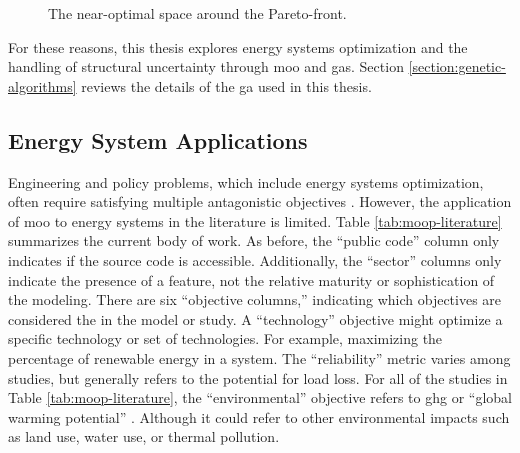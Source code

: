 \begin{figure}[H]
  \centering
  \resizebox{0.6\columnwidth}{!}{}
  \caption{The near-optimal space around the Pareto-front.}
  \label{fig:near-opt-pareto}
\end{figure}

For these reasons, this thesis explores energy systems optimization and the
handling of structural uncertainty through \ac{moo} and \acp{ga}. Section
\ref{section:genetic-algorithms} reviews the details of the \ac{ga} used in this
thesis.


% 



\subsection{Energy System Applications}
Engineering and policy problems, which include energy
systems optimization, often require satisfying multiple antagonistic objectives
\cite{loughlin_genetic_2001,zechman_evolutionary_2004,
zechman_evolutionary_2013, chattopadhyay_need_2021}. However, the application of
\ac{moo} to energy systems in the literature is limited. Table
\ref{tab:moop-literature} summarizes the current body of work. As before, the
``public code'' column only indicates if the source code is accessible.
Additionally, the ``sector'' columns only indicate the presence of a feature,
not the relative maturity or sophistication of the modeling. There are six
``objective columns,'' indicating which objectives are considered the in the
model or study. A ``technology'' objective might optimize a specific technology
or set of technologies. For example, maximizing the percentage of renewable
energy in a system. The ``reliability'' metric varies among studies, but
generally refers to the potential for load loss. For all of the studies in Table
\ref{tab:moop-literature}, the ``environmental'' objective refers to \ac{ghg} or
``global warming potential'' \cite{de-leon_almaraz_deployment_2015}. Although it
could refer to other environmental impacts such as land use, water use, or
thermal pollution. 

